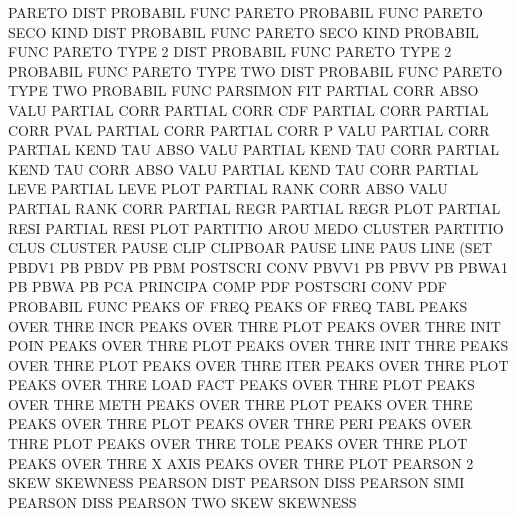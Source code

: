 PARETO   DIST                           PROBABIL FUNC
PARETO                                  PROBABIL FUNC
PARETO   SECO KIND DIST                 PROBABIL FUNC
PARETO   SECO KIND                      PROBABIL FUNC
PARETO   TYPE 2    DIST                 PROBABIL FUNC
PARETO   TYPE 2                         PROBABIL FUNC
PARETO   TYPE TWO  DIST                 PROBABIL FUNC
PARETO   TYPE TWO                       PROBABIL FUNC
PARSIMON                                FIT
PARTIAL  CORR ABSO VALU                 PARTIAL  CORR
PARTIAL  CORR CDF                       PARTIAL  CORR
PARTIAL  CORR PVAL                      PARTIAL  CORR
PARTIAL  CORR P    VALU                 PARTIAL  CORR
PARTIAL  KEND TAU  ABSO VALU            PARTIAL  KEND TAU  CORR
PARTIAL  KEND TAU  CORR ABSO VALU       PARTIAL  KEND TAU  CORR
PARTIAL  LEVE                           PARTIAL  LEVE PLOT
PARTIAL  RANK CORR ABSO VALU            PARTIAL  RANK CORR
PARTIAL  REGR                           PARTIAL  REGR PLOT
PARTIAL  RESI                           PARTIAL  RESI PLOT
PARTITIO AROU MEDO                      CLUSTER
PARTITIO CLUS                           CLUSTER
PAUSE    CLIP                           CLIPBOAR
PAUSE    LINE                           PAUS     LINE (SET
PBDV1                                   PB
PBDV                                    PB
PBM                                     POSTSCRI CONV
PBVV1                                   PB
PBVV                                    PB
PBWA1                                   PB
PBWA                                    PB
PCA                                     PRINCIPA COMP
PDF                                     POSTSCRI CONV
PDF                                     PROBABIL FUNC
PEAKS    OF   FREQ                      PEAKS    OF   FREQ TABL
PEAKS    OVER THRE INCR                 PEAKS    OVER THRE PLOT
PEAKS    OVER THRE INIT POIN            PEAKS    OVER THRE PLOT
PEAKS    OVER THRE INIT THRE            PEAKS    OVER THRE PLOT
PEAKS    OVER THRE ITER                 PEAKS    OVER THRE PLOT
PEAKS    OVER THRE LOAD FACT            PEAKS    OVER THRE PLOT
PEAKS    OVER THRE METH                 PEAKS    OVER THRE PLOT
PEAKS    OVER THRE                      PEAKS    OVER THRE PLOT
PEAKS    OVER THRE PERI                 PEAKS    OVER THRE PLOT
PEAKS    OVER THRE TOLE                 PEAKS    OVER THRE PLOT
PEAKS    OVER THRE X    AXIS            PEAKS    OVER THRE PLOT
PEARSON  2    SKEW                      SKEWNESS
PEARSON  DIST                           PEARSON  DISS
PEARSON  SIMI                           PEARSON  DISS
PEARSON  TWO  SKEW                      SKEWNESS
